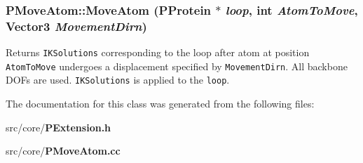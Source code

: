 \subsubsection{ PMove\-Atom::Move\-Atom ({\bf PProtein} $\ast$ {\em loop}, int {\em Atom\-To\-Move}, Vector3 {\em Movement\-Dirn})\hspace{0.3cm}{\tt  [static]}}\label{classPMoveAtom_fc8ea421b83f1152ef7e204f0b3bac08}


Returns {\tt IKSolutions} corresponding to the loop after atom at position {\tt Atom\-To\-Move} undergoes a displacement specified by {\tt Movement\-Dirn}. All backbone DOFs are used. {\tt IKSolutions} is applied to the {\tt loop}. 

The documentation for this class was generated from the following files:\begin{CompactItemize}
\item 
src/core/{\bf PExtension.h}\item 
src/core/{\bf PMove\-Atom.cc}\end{CompactItemize}
